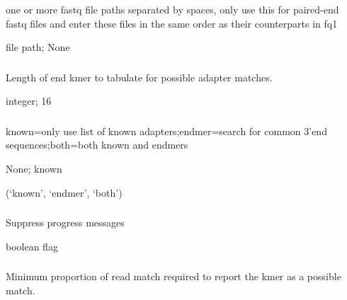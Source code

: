 \documentclass[letterpaper,11pt,english]{sphinxmanual}
\begin{document}
\subsubsection{}
\label{\detokenize{prog_desc:fq2}}
 one or more fastq file paths separated by spaces, only use this for paired-end fastq files and enter these files in the same order as their counterparts in \textendash{}fq1

 file path;  None


\subsubsection{}
\label{\detokenize{prog_desc:k-end-klength}}
 Length of end kmer to tabulate for possible adapter matches.

 integer;  16


\subsubsection{}
\label{\detokenize{prog_desc:m-mode}}
 known=only use list of known adapters;endmer=search for common 3’end sequences;both=both known and endmers

 None;  known

 (‘known’, ‘endmer’, ‘both’)


\subsubsection{}
\label{\detokenize{prog_desc:quiet}}
 Suppress progress messages

 boolean flag


\subsubsection{}
\label{\detokenize{prog_desc:m-min-match}}
 Minimum proportion of read match required to report the kmer as a possible match.
\end{document}
